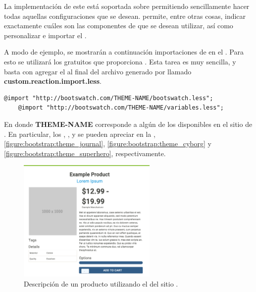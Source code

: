 La implementación de este \packagesAS está soportada sobre \bootstrapPackage permitiendo sencillamente hacer todas aquellas configuraciones que se desean. \bootstrapPackage permite, entre otras cosas, indicar exactamente cuáles son las componentes de \bootstrapNAME que se desean utilizar, así como personalizar e importar el \themeCPT.

A modo de ejemplo, se mostrarán a continuación importaciones de \themesCPT en el \frameworkPC. Para esto se utilizará los \themesCPT gratuitos que proporciona \bootswatchNAME. Esta tarea es muy sencilla, y basta con agregar el  al final del archivo generado por \bootstrapPackage llamado \textbf{custom.reaction.import.less}.

\medskip
\begin{lstlisting}[caption= Código genérico para importar \themesCPT desde \bootswatchNAME., label=source:less:generic_bootswatch_theme]
	@import "http://bootswatch.com/THEME-NAME/bootswatch.less";
	@import "http://bootswatch.com/THEME-NAME/variables.less";
\end{lstlisting}

En donde \textbf{THEME-NAME} corresponde a algún \themeCPT de los disponibles en el sitio de \bootswatchNAME. En particular, los \themesCPT \textbf{\themeSandstone}, \textbf{\themeJournal}, \textbf{\themeCyborg} y \textbf{\themeSuperHero} se pueden apreciar en la , \ref{figure:bootstrap:theme_journal}, \ref{figure:bootstrap:theme_cyborg} y \ref{figure:bootstrap:theme_superhero}, respectivamente.


\begin{figure}[H]
	\centering
	\includegraphics[width=0.6\textwidth]{figuras/bootstrap/bootstrap_theme_sandstone.png}

	\caption{Descripción de un producto utilizando el \themeCPT \textbf{\themeSandstone} del sitio \bootswatchNAME.}
	\label{figure:bootstrap:theme_standstone}
\end{figure}

